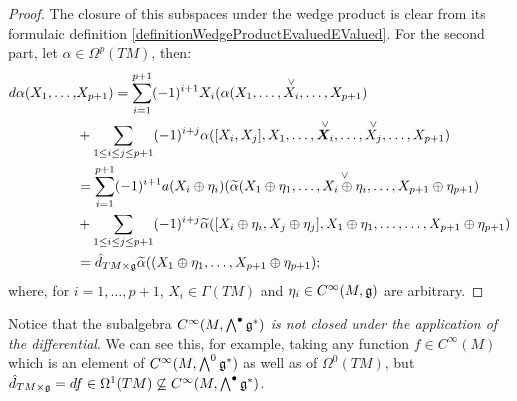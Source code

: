 \begin{proof}
The closure of this subspaces under the wedge product is clear from its formulaic definition \eqref{definitionWedgeProductEvaluedEValued}. For the second part, let $\alpha \in \Omega^p(TM)$, then:
\begin{align*}
d\alpha (X_1, \dots,& X_{p+1})
        = \sum_{i = 1}^{p+1} (-1)^{i+1}X_i(\alpha(X_1, \dots, \overset{\vee}{X_i}, \dots, X_{p+1}) \\
        &+ \sum_{1 \leq i \leq j \leq p+1} (-1)^{i+j} \alpha([X_i, X_j], X_1, \dots, \overset{\vee}{\bm{X}_i}, \dots, \overset{\vee}{X_j}, \dots, X_{p+1})\\
        &= \sum_{i = 1}^{p+1} (-1)^{i+1}a(X_i \oplus \eta_i)(\widetilde \alpha(X_1 \oplus \eta_1, \dots, \overset{\vee}{X_i \oplus \eta_i}, \dots, X_{p+1} \oplus \eta_{p+1}) \\
        &+ \sum_{1 \leq i \leq j \leq p+1} (-1)^{i+j} \widetilde \alpha([X_i \oplus \eta_i, X_j \oplus \eta_j], X_1 \oplus \eta_1, \dots, \dots, X_{p+1} \oplus \eta_{p+1})\\
        &= \hat d_{TM\times \mathfrak{g}} \widetilde \alpha((X_1 \oplus \eta_1, \dots, X_{p+1} \oplus \eta_{p+1});
    \end{align*}
where, for $i = 1, \dots, p+1$, $X_i \in \Gamma(TM)$ and $\eta_i \in C^\infty(M, \mathfrak{g})$ are arbitrary.
\end{proof}

\begin{remark}
Notice that the subalgebra $C^\infty(M, \bigwedge^\bullet \mathfrak{g}^*)$ \textit{is not closed under the application of the differential}. We can see this, for example, taking any function $f \in C^\infty(M)$ which is an element of $C^\infty(M, \bigwedge^0 \mathfrak{g}^*)$ as well as of $\Omega^0(TM)$, but $\hat d_{TM \times \mathfrak{g}} = df \in \Omega^1(TM) \not\subseteq C^\infty(M, \bigwedge^\bullet \mathfrak{g}^*)$.
\end{remark}

